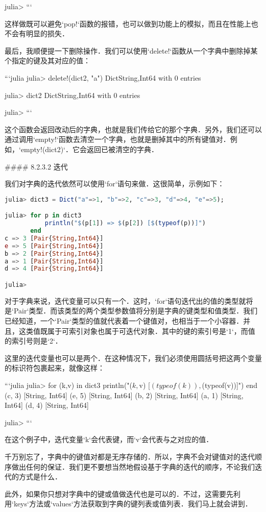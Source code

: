 julia> 
```

这样做既可以避免`pop!`函数的报错，也可以做到功能上的模拟，而且在性能上也不会有明显的损失．

最后，我顺便提一下删除操作．我们可以使用`delete!`函数从一个字典中删除掉某个指定的键及其对应的值：

```julia
julia> delete!(dict2, "a")
Dict{String,Int64} with 0 entries

julia> dict2
Dict{String,Int64} with 0 entries

julia> 
```

这个函数会返回改动后的字典，也就是我们传给它的那个字典．另外，我们还可以通过调用`empty!`函数去清空一个字典，也就是删掉其中的所有键值对．例如，`empty!(dict2)`．它会返回已被清空的字典．

#### 8.2.3.2 迭代

我们对字典的迭代依然可以使用`for`语句来做．这很简单，示例如下：
\begin{lstlisting}[language=julia]
julia> dict3 = Dict("a"=>1, "b"=>2, "c"=>3, "d"=>4, "e"=>5);

julia> for p in dict3
           println("$(p[1]) => $(p[2]) [$(typeof(p))]")
       end
c => 3 [Pair{String,Int64}]
e => 5 [Pair{String,Int64}]
b => 2 [Pair{String,Int64}]
a => 1 [Pair{String,Int64}]
d => 4 [Pair{String,Int64}]

julia> 
\end{lstlisting}

对于字典来说，迭代变量可以只有一个．这时，`for`语句迭代出的值的类型就将是`Pair`类型．而该类型的两个类型参数值将分别是字典的键类型和值类型．我们已经知道，一个`Pair`类型的值就代表着一个键值对，也相当于一个小容器．并且，这类值既属于可索引对象也属于可迭代对象．其中的键的索引号是`1`，而值的索引号则是`2`．

这里的迭代变量也可以是两个．在这种情况下，我们必须使用圆括号把这两个变量的标识符包裹起来，就像这样：

```julia
julia> for (k,v) in dict3
           println("($k, $v) [$(typeof(k)), $(typeof(v))]")
       end
(c, 3) [String, Int64]
(e, 5) [String, Int64]
(b, 2) [String, Int64]
(a, 1) [String, Int64]
(d, 4) [String, Int64]

julia> 
```

在这个例子中，迭代变量`k`会代表键，而`v`会代表与之对应的值．

千万别忘了，字典中的键值对都是无序存储的．所以，字典不会对键值对的迭代顺序做出任何的保证．我们更不要想当然地假设基于字典的迭代的顺序，不论我们迭代的方式是什么．

此外，如果你只想对字典中的键或值做迭代也是可以的．不过，这需要先利用`keys`方法或`values`方法获取到字典的键列表或值列表．我们马上就会讲到．

